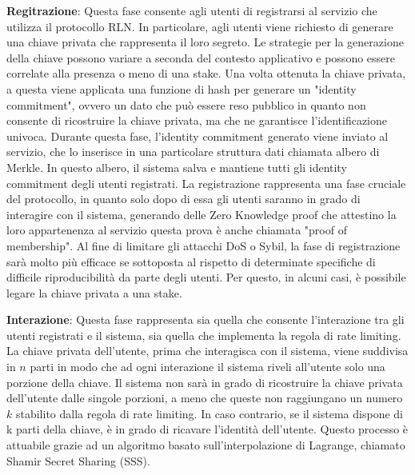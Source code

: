 \textbf{Regitrazione}: Questa fase consente agli utenti di registrarsi al servizio che utilizza il protocollo RLN. In
particolare, agli utenti viene richiesto di generare una chiave privata che rappresenta il loro segreto. Le strategie
per la generazione della chiave possono variare a seconda del contesto applicativo e possono essere correlate alla
presenza o meno di una stake. Una volta ottenuta la chiave privata, a questa viene applicata una funzione di hash per
generare un "identity commitment", ovvero un dato che può essere reso pubblico in quanto non consente di ricostruire la
chiave privata, ma che ne garantisce l'identificazione univoca. Durante questa fase, l'identity commitment generato
viene inviato al servizio, che lo inserisce in una particolare struttura dati chiamata albero di Merkle. In questo
albero, il sistema salva e mantiene tutti gli identity commitment degli utenti registrati. La registrazione rappresenta
una fase cruciale del protocollo, in quanto solo dopo di essa gli utenti saranno in grado di interagire con il sistema,
generando delle Zero Knowledge proof che attestino la loro appartenenza al servizio questa prova è anche chiamata "proof
of membership". Al fine di limitare gli attacchi DoS o Sybil, la fase di registrazione sarà molto più efficace se
sottoposta al rispetto di determinate specifiche di difficile riproducibilità da parte degli utenti. Per questo, in
alcuni casi, è possibile legare la chiave privata a una stake.

\textbf{Interazione}: Questa fase rappresenta sia quella che consente l'interazione tra gli utenti registrati e il sistema, sia quella che implementa la regola di rate limiting. La chiave privata dell'utente, prima che interagisca con il sistema, viene suddivisa in $n$ parti in modo che ad ogni interazione il sistema riveli all'utente solo una porzione della chiave. Il sistema non sarà in grado di ricostruire la chiave privata dell'utente dalle singole porzioni, a meno che queste non raggiungano un numero $k$ stabilito dalla regola di rate limiting. In caso contrario, se il sistema dispone di k parti della chiave, è in grado di ricavare l'identità dell'utente. Questo processo è attuabile grazie ad un algoritmo basato sull'interpolazione di Lagrange, chiamato Shamir Secret Sharing (SSS).


